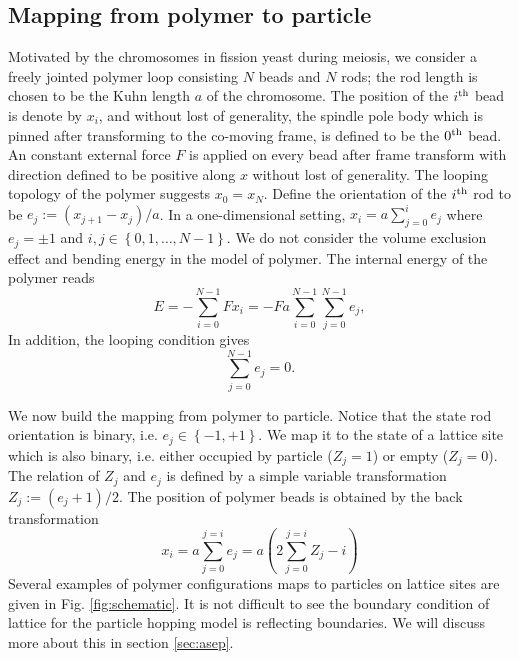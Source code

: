 \documentclass[aps,showpacs,twocolumn,floatfix,prx,superscriptaddress]{revtex4-1}
\begin{document}
\subsection{Mapping from polymer to particle}
\label{sec:mapping}
Motivated by the chromosomes in fission yeast during meiosis, we consider a
freely jointed polymer loop consisting $N$ beads and $N$ rods; the rod length is
chosen to be the Kuhn length $a$ of the chromosome.  
The position of the $i^{\rm th}$ bead is denote by $x_i$, and without lost of
generality, the spindle pole body which is pinned after transforming to the
co-moving frame, is defined to be the $0^{\rm th}$ bead. An constant external
force $F$ is applied on every bead after frame transform with direction defined
to be positive along $x$ without lost of generality. The looping topology of the
polymer suggests $x_0=x_N$. Define the orientation of the $i^{\rm th}$ rod to be
$e_j:=(x_{j+1} - x_{j})/a$.  In a one-dimensional setting, $x_i =
a\sum_{j=0}^{i} e_j$ where $e_j=\pm 1$ and $i,j \in \left\{0, 1, \ldots,
    N-1\right\}$. We do not consider the volume exclusion effect and bending
energy in the model of polymer. The internal energy of the polymer reads
\begin{equation}
    \label{eq:energy_polymer}
    E  = -\sum_{i=0}^{N-1} {Fx_i} = -Fa\sum_{i=0}^{N-1} \sum_{j=0}^{N-1}e_j, 
\end{equation}
In addition, the looping condition gives
\begin{equation}
    \label{eq:looping}
    \sum_{j=0}^{N-1} e_j = 0.
\end{equation}

We now build the mapping from polymer to particle. Notice that the state rod
orientation is binary, i.e. $e_j \in \left\{-1, +1\right\}$. We map it to the state of a
lattice site which is also binary, i.e. either occupied by particle ($Z_j = 1$)
or empty ($Z_j = 0$). The relation of $Z_j$ and $e_j$ is defined by a simple
variable transformation $Z_j := \left(e_j+1\right)/2$. The position of polymer
beads is obtained by the back transformation
\begin{equation}
    \label{eq:z2x}
    x_i = a \sum_{j=0}^{j=i}{e_j} = a\left(2\sum_{j=0}^{j=i}{Z_j} -i\right)
\end{equation}
Several examples of polymer configurations maps to particles on lattice sites are given
in Fig. \ref{fig:schematic}. It is not difficult to see the boundary condition of
lattice for the particle hopping model is reflecting boundaries. We will
discuss more about this in section \ref{sec:asep}.
\end{document}
